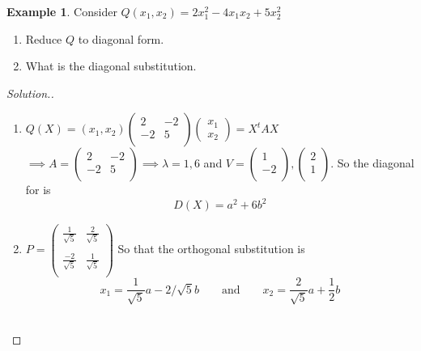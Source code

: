 \documentclass[11pt,a4paper]{article}
\theoremstyle{definition}
\newtheorem{exa}[thm]{Example}
\newenvironment{solution}
  {\renewcommand{\qedsymbol}{}\begin{proof}[\textit{Solution}.]}
  {\end{proof}}
\begin{document}
\begin{exa}
Consider $Q(x_1,x_2)=2x^2_1-4x_1x_2+5x_2^2$
\begin{enumerate}
\item[i.] Reduce $Q$ to diagonal form.
\item[ii.] What is the diagonal substitution.
\end{enumerate}
\end{exa}


\begin{solution}
\begin{enumerate}
\item[i.] $Q(X)=(x_1,x_2)
\begin{pmatrix}
2&-2\\-2&5\\
\end{pmatrix}
\begin{pmatrix}
x_1\\x_2
\end{pmatrix}
=X^tAX$
$\implies A=
\begin{pmatrix}
2&-2\\-2&5\\
\end{pmatrix}
\implies \lambda=1,6$ and 
$
V=
\begin{pmatrix}
1\\-2\\
\end{pmatrix},
\begin{pmatrix}
2\\1\\
\end{pmatrix}
$. So the diagonal for is $$D(X)=a^2+6b^2$$
\item[ii.] $P=
\begin{pmatrix}
\frac{1}{\sqrt{5}}&\frac{2}{\sqrt{5}}\\\\ \frac{-2}{\sqrt{5}}&\frac{1}{\sqrt{5}}\\
\end{pmatrix}
$ So that the orthogonal substitution is\\ $$x_1=\frac{1}{\sqrt{5}}a-2/\sqrt{5}b\qquad\text{and}\qquad  x_2=\frac{2}{\sqrt{5}}a+\frac{1}{2}b$$\\
\end{enumerate}


\pagebreak
\end{solution}
\end{document}
